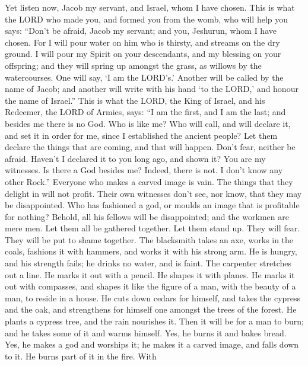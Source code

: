 Yet listen now, Jacob my servant, and Israel, whom I have
chosen.  This is what the LORD who made you, and formed you
from the womb, who will help you says: ``Don't be afraid, Jacob my
servant; and you, Jeshurun, whom I have chosen.  For I will
pour water on him who is thirsty, and streams on the dry ground. I will
pour my Spirit on your descendants, and my blessing on your offspring;
 and they will spring up amongst the grass, as willows by
the watercourses.  One will say, `I am the LORD's.' Another
will be called by the name of Jacob; and another will write with his
hand `to the LORD,' and honour the name of Israel.''  This
is what the LORD, the King of Israel, and his Redeemer, the LORD of
Armies, says: ``I am the first, and I am the last; and besides me there
is no God.  Who is like me? Who will call, and will declare
it, and set it in order for me, since I established the ancient people?
Let them declare the things that are coming, and that will happen.
 Don't fear, neither be afraid. Haven't I declared it to you
long ago, and shown it? You are my witnesses. Is there a God besides me?
Indeed, there is not. I don't know any other Rock.'' 
Everyone who makes a carved image is vain. The things that they delight
in will not profit. Their own witnesses don't see, nor know, that they
may be disappointed.  Who has fashioned a god, or moulds an
image that is profitable for nothing?  Behold, all his
fellows will be disappointed; and the workmen are mere men. Let them all
be gathered together. Let them stand up. They will fear. They will be
put to shame together.  The blacksmith takes an axe, works
in the coals, fashions it with hammers, and works it with his strong
arm. He is hungry, and his strength fails; he drinks no water, and is
faint.  The carpenter stretches out a line. He marks it out
with a pencil. He shapes it with planes. He marks it out with compasses,
and shapes it like the figure of a man, with the beauty of a man, to
reside in a house.  He cuts down cedars for himself, and
takes the cypress and the oak, and strengthens for himself one amongst
the trees of the forest. He plants a cypress tree, and the rain
nourishes it.  Then it will be for a man to burn; and he
takes some of it and warms himself. Yes, he burns it and bakes bread.
Yes, he makes a god and worships it; he makes it a carved image, and
falls down to it.  He burns part of it in the fire. With
